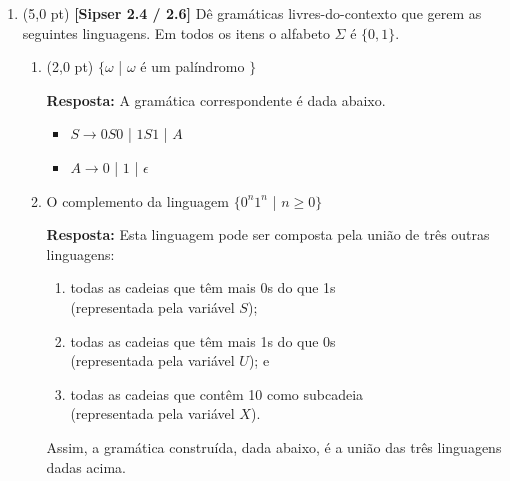 \documentclass[12pt,a4paper,oneside]{article}
\begin{document}
\begin{enumerate}
\begin{enumerate}
		{\color{blue} {\bf Resposta:} Ora se $\overline{A \cap B} = \overline{A} \cup \overline{B}$, então $A \cap B = \overline{\overline{A} \cup \overline{B}}$ Sabemos pela parte (a) que não podemos garantir que $A \cap B$ seja uma LLC, sabendo que $A$ e $B$ são LLCs. Logo, pela igualdade, não podemos garantir que $\overline{\overline{A} \cup \overline{B}}$ seja uma LLC. Como as LLCs são fechadas sob união, só resta admitir que as LLCs não são fechadas sob complementação $\blacksquare$
		}
	\end{enumerate}

\newpage
	
	\item (5,0 pt) {\bf [Sipser 2.4 / 2.6]}  Dê gramáticas livres-do-contexto que gerem as seguintes linguagens. Em todos os itens o alfabeto $\Sigma$ é $\{0,1\}$.
	\begin{enumerate}
		\item (2,0 pt) $\{\omega$ | $\omega$ é um palíndromo $\}$
		
		\vspace*{0.3cm}
		
		{\color{blue} {\bf Resposta:} A gramática correspondente é dada abaixo.
			\begin{itemize}
				\item[] $S \rightarrow 0S0$ | $1S1$ | $A$
				\item[] $A \rightarrow 0$ | $1$ | $\epsilon$
			\end{itemize}
		}
		\item  O complemento da linguagem $\{0^n 1^n$ | $n \geq 0 \}$
		
		\vspace*{0.3cm}
		
		{\color{blue} {\bf Resposta:} Esta linguagem pode ser composta pela união de três outras linguagens: 
			\begin{enumerate}
				\item todas as cadeias que têm mais 0s do que 1s \\(representada pela variável $S$);
				\item todas as cadeias que têm mais 1s do que 0s \\(representada pela variável $U$); e
				\item todas as cadeias que contêm 10 como subcadeia \\(representada pela variável $X$).
			\end{enumerate}
			Assim, a gramática construída, dada abaixo, é a união das três linguagens dadas acima.
			
}
\end{enumerate}
\end{enumerate}
\end{document}
